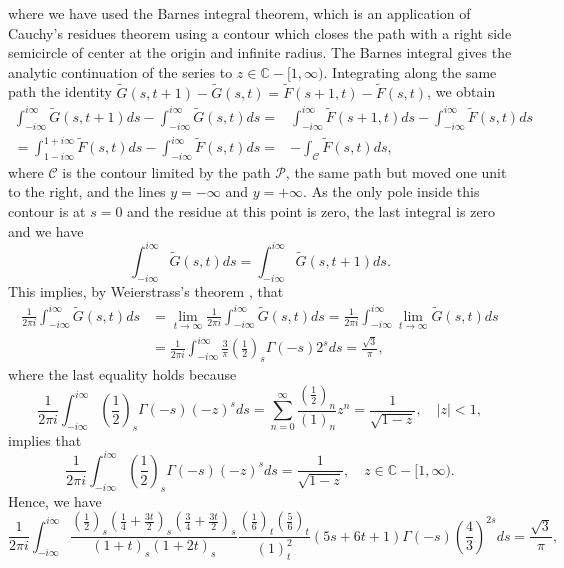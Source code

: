 \documentclass[12pt,a4paper]{amsart}
\begin{document}
where we have used the Barnes integral theorem, which is an application of Cauchy's residues theorem using a contour which closes the path with a right side semicircle of center at the origin and infinite radius. The Barnes integral gives the analytic continuation of the series to $z \in \mathbb{C}-[1,\infty)$.
Integrating along the same path the identity $\widetilde{G}(s,t+1)-\widetilde{G}(s,t)=\widetilde{F}(s+1,t)-\widetilde{F}(s,t)$, we obtain
\begin{align}
 \int_{-i\infty}^{i\infty} \widetilde{G}(s,t+1)ds- \int_{-i\infty}^{i\infty} \widetilde{G}(s,t)ds =&
\int_{-i\infty}^{i\infty} \widetilde{F}(s+1,t)ds- \int_{-i\infty}^{i\infty} \widetilde{F}(s,t)ds  \\
= \nonumber \int_{1-i\infty}^{1+i\infty} \widetilde{F}(s,t)ds- \int_{-i\infty}^{i\infty} \widetilde{F}(s,t)ds=&-\int_{\mathcal{C}} \widetilde{F}(s,t)ds, \nonumber
\end{align}
where $\mathcal{C}$ is the contour limited by the path $\mathcal{P}$, the same path but moved one unit to the right, and the lines $y=-\infty$ and $y=+\infty$. As the only pole inside this contour is at $s=0$ and the residue at this point is zero, the last integral is zero and we have
\begin{equation}
\int_{-i\infty}^{i\infty}\widetilde{G}(s,t)ds=\int_{-i\infty}^{i\infty} \widetilde{G}(s,t+1)ds.
\end{equation}
This implies, by Weierstrass's theorem \cite{whittaker}, that
\begin{align}\nonumber
\frac{1}{2 \pi i} \int_{-i\infty}^{i\infty} \widetilde{G}(s,t)ds &=
\lim_{t \to \infty} \frac{1}{2 \pi i} \int_{-i\infty}^{i\infty} \widetilde{G}(s,t)ds=
\frac{1}{2 \pi i} \int_{-i\infty}^{i\infty} \lim_{t \to \infty} \widetilde{G}(s,t)ds \\ &=
\frac{1}{2 \pi i} \int_{-i\infty}^{i\infty} \frac{3}{\pi} \left( \frac{1}{2} \right)_{\!s} \Gamma(-s) 2^s ds=
\frac{\sqrt{3}}{\pi}, \nonumber
\end{align}
where the last equality holds because
\[
\frac{1}{2 \pi i} \int_{-i\infty}^{i\infty} \left( \frac{1}{2} \right)_{\!s} \Gamma(-s) (-z)^s ds =\sum_{n=0}^{\infty} \frac{\left( \frac12\right)_n}{(1)_n}z^n=\frac{1}{\sqrt{1-z}}, \quad |z|<1,
\]
implies that
\[
\frac{1}{2 \pi i} \int_{-i\infty}^{i\infty} \left( \frac{1}{2} \right)_{\!s} \Gamma(-s) (-z)^s ds=\frac{1}{\sqrt{1-z}}, \quad z \in \mathbb{C}-[1,\infty).
\]
Hence, we have
\[
\frac{1}{2 \pi i} \int_{-i\infty}^{i\infty} \frac{\left( \frac{1}{2} \right)_{\!s} \left( \frac{1}{4}+\frac{3t}{2} \right)_{\!s} \left( \frac{3}{4}+\frac{3t}{2} \right)_{\!s}}{(1+t)_{\!s} (1+2t)_{\!s}}  \frac{\left( \frac{1}{6} \right)_t \left( \frac{5}{6} \right)_t}{(1)_t^2} (5s+6t+1) \Gamma(-s)\left( \frac{4}{3} \right)^{2s}ds=\frac{\sqrt{3}}{\pi},
\]
\end{document}
